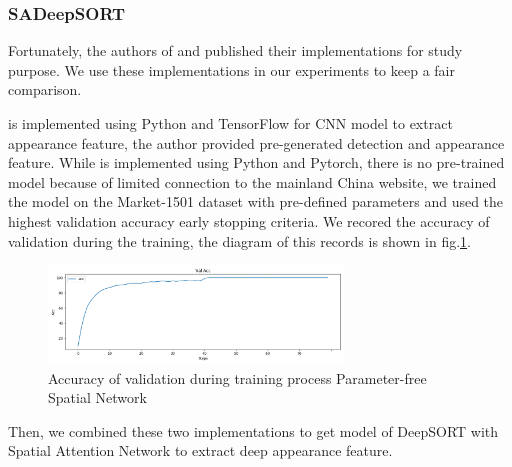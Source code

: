 \subsubsection{SADeepSORT}
\hspace{0.5cm}Fortunately, the authors of \cite{Wojke2017simple} and \cite{SA} published their implementations for study purpose. We use these implementations in our experiments to keep a fair comparison.\par
\cite{Wojke2017simple} is implemented using Python and TensorFlow for CNN model to extract appearance feature, the author provided pre-generated detection and appearance feature. While \cite{SA} is implemented using Python and Pytorch, 
there is no pre-trained model because of limited connection to the mainland China website, we trained the model on the Market-1501 dataset with pre-defined parameters and used the highest validation accuracy early stopping criteria.
We recored the accuracy of validation during the training, the diagram of this records is shown in fig.\ref{fig:val_acc_sa_train}.\par
\begin{figure}[h!]
    \centering
    \includegraphics[width=0.7\textwidth]{Chapters/Fig/val_acc_sa_train.png}
    \caption{Accuracy of validation during training process Parameter-free Spatial Network}
    \label{fig:val_acc_sa_train}
\end{figure}
Then, we combined these two implementations to get model of DeepSORT with Spatial Attention Network to extract deep appearance feature.\par
